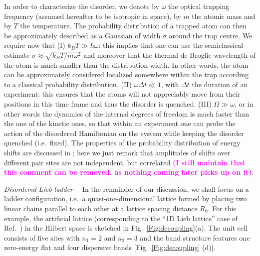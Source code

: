 \documentclass[prl,aps,twocolumn,showpacs,superscriptaddress,longbibliography]{revtex4-1}
\newcommand{\tochange}[1]{\textcolor{magenta}{#1}}
\newcommand{\mm}[1]{{\tochange{\footnotesize{\bf (#1)}}}}
\begin{document}
In order to characterize the disorder, we denote by $\omega$ the optical trapping frequency (assumed hereafter to be isotropic in space), by $m$ the atomic mass and by $T$ the temperature. The probability distribution of a trapped atom can then be approximately described as a Gaussian of width $\sigma$ around the trap centre. We require now that (I) $k_B T \gg \hbar \omega$: this implies that one can use the semiclassical estimate $\sigma \approx \sqrt{k_B T / m\omega^2}$ and moreover that the thermal de Broglie wavelength of the atom is much smaller than the distribution width. In other words, the atom can be approximately considered localized somewhere within the trap according to a classical probability distribution. (II) $\omega \Delta t \ll 1$, with $\Delta t$ the duration of an experiment: this ensures that the atoms will not appreciably move from their positions in this time frame and thus the disorder is quenched. (III) $\Omega \gg \omega$, or in other words the dynamics of the internal degrees of freedom is much faster than the one of the kinetic ones, so that within an experiment one can probe the action of the disordered Hamiltonian on the system while keeping the disorder quenched (i.e.~fixed). The properties of the probability distribution of energy shifts are discussed in \cite{SM}; here we just remark that amplitudes of shifts over different pair sites are not independent, but correlated \mm{I still maintain that this comment can be removed, as nothing coming later picks up on it}.

\emph{Disordered Lieb ladder---} In the remainder of our discussion, we shall focus on a ladder configuration, i.e.~a quasi-one-dimensional lattice formed by placing two linear chains parallel to each other at a lattice spacing distance $R_0$. For this example, the artificial lattice (corresponding to the ``1D Lieb lattice'' case of Ref.~\cite{Leykam2017}) in the Hilbert space is sketched in Fig.~\ref{Fig:decoupling}(a). The unit cell consists of five sites with $n_1 = 2$ and $n_2 = 3$ and the band structure features one zero-energy flat and four dispersive bands [Fig.~\ref{Fig:decoupling} (d)].
\end{document}
